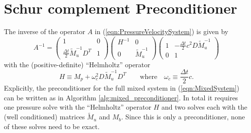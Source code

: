 \documentclass[10pt]{article}
\begin{document}
\section{Schur complement Preconditioner}
The inverse of the operator $A$ in (\ref{eqn:PressureVelocitySystem}) is given by
\begin{equation}
  A^{-1} = 
\begin{pmatrix}
  1 & 0 \\[1ex]
  \frac{\Delta t}{2}\tilde{M}_u^{-1} D^T & 1
\end{pmatrix}
\begin{pmatrix}
  H^{-1} & 0 \\[1ex] 0 & \tilde{M}_u^{-1}
\end{pmatrix}
\begin{pmatrix}
  1 & -\frac{\Delta t}{2}c^2D\tilde{M}_u^{-1} \\[1ex]
  0 & 1
\end{pmatrix}\label{eqn:SchurComplement}
\end{equation}
with the (positive-definite) ``Helmholtz'' operator
\begin{equation}
  H \equiv M_p + \omega_c^2 D\tilde{M}_u^{-1} D^T
\qquad\text{where}\quad \omega_c \equiv \frac{\Delta t}{2}c.
  \label{eqn:HelmholtzOperator}
\end{equation}
Explicitly, the preconditioner for the full mixed system in (\ref{eqn:MixedSystem}) can be written as in Algorithm \ref{alg:mixed_preconditioner}. In total it requires one pressure solve with the ``Helmholtz'' operator $H$ and two solves each with the (well conditioned) matrices $\tilde{M}_u$ and $M_b$. Since this is only a preconditioner, none of these solves need to be exact.
\end{document}
